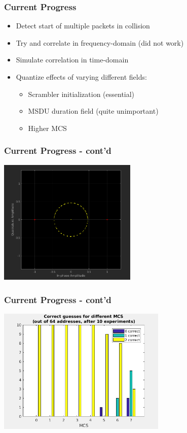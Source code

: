 \documentclass[accentcolor=tud8b,colorbacktitle]{tudbeamer}
\begin{document}
\begin{frame}
\frametitle{Current Progress}
\begin{itemize}
	\setlength\itemsep{1em}
	\item Detect start of multiple packets in collision
	\item Try and correlate in frequency-domain (did not work)
	\item Simulate correlation in time-domain
	\item Quantize effects of varying different fields:
	\begin{itemize}
		\setlength\itemsep{1em}
		\item Scrambler initialization (essential)
		\item MSDU duration field (quite unimportant)
		\item Higher MCS
	\end{itemize}
\end{itemize}
\end{frame}


\begin{frame}
\frametitle{Current Progress - cont'd}
\begin{center}
	\includegraphics[height=6cm]{assets/freq-correlation}
\end{center}
\end{frame}


\begin{frame}
\frametitle{Current Progress - cont'd}
\begin{center}
	\includegraphics[height=6cm]{assets/higher-mcs}
\end{center}
\end{frame}
\end{document}
